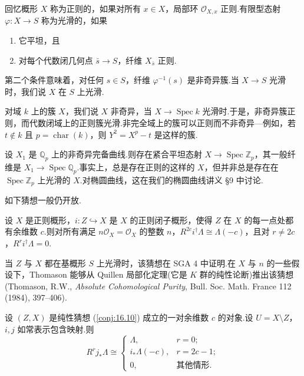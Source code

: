 回忆概形 $X$ 称为正则的，如果对所有 $x \in X$，局部环 $\mathcal{O}_{X, x}$ 正则.有限型态射 $\varphi \colon X \to S$ 称为光滑的，如果
\begin{enumerate}
  \item 它平坦，且
  \item 对每个代数闭几何点 $\bar{s} \to S$，纤维 $X_{\bar{s}}$ 正则.
\end{enumerate}
第二个条件意味着，对任何 $s \in S$，纤维 $\varphi^{-1}(s)$ 是非奇异簇.当 $X \to S$ 光滑时，我们说 $X$ 在 $S$ 上光滑.

对域 $k$ 上的簇 $X$，我们说 $X$ 非奇异，当 $X \to \operatorname{Spec} k$ 光滑时.于是，非奇异簇正则，而代数闭域上的正则簇光滑.非完全域上的簇可以正则而不非奇异---例如，若 $t \notin k$ 且 $p = \operatorname{char}(k)$，则 $Y^{2} = X^{p} - t$ 是这样的簇.

\begin{example}\label{ex:16.9}
设 $X_1$ 是 $\mathbb{Q}_p$ 上的非奇异完备曲线.则存在紧合平坦态射 $X \to \operatorname{Spec} \mathbb{Z}_p$，其一般纤维是 $X_1 \to \operatorname{Spec} \mathbb{Q}_p$.事实上，总是存在正则的这样的 $X$，但并非总是存在在 $\operatorname{Spec} \mathbb{Z}_p$ 上光滑的 $X$.对椭圆曲线，这在我们的椭圆曲线讲义 \S 9 中讨论.
\end{example}

如下猜想一般仍开放.

\begin{conjecture}\label{conj:16.10}
设 $X$ 是正则概形，$i \colon Z \hookrightarrow X$ 是 $X$ 的正则闭子概形，使得 $Z$ 在 $X$ 的每一点处都有余维数 $c$.则对所有满足 $n\mathcal{O}_X = \mathcal{O}_X$ 的整数 $n$，$R^{2c}i^{\dagger}\Lambda \cong \Lambda(-c)$，且对 $r \neq 2c$，$R^{r}i^{\dagger}\Lambda = 0$.
\end{conjecture}

当 $Z$ 与 $X$ 都在基概形 $S$ 上光滑时，该猜想在 SGA 4 中证明.在 $X$ 与 $n$ 的一些假设下，Thomason 能够从 Quillen 局部化定理(它是 $K$ 群的纯性论断)推出该猜想(Thomason, R.W., \emph{Absolute Cohomological Purity}, Bull. Soc. Math. France 112 (1984), 397--406).

\begin{proposition}\label{prop:16.11}
设 $(Z, X)$ 是纯性猜想 (\ref{conj:16.10}) 成立的一对余维数 $c$ 的对象.设 $U = X \setminus Z$，$i, j$ 如常表示包含映射.则
\[
R^{r}j_{*}\Lambda \cong \begin{cases}
\Lambda, & r = 0;\\
i_{*}\Lambda(-c), & r = 2c - 1;\\
0, & \text{其他情形}.
\end{cases}
\]
\end{proposition}

